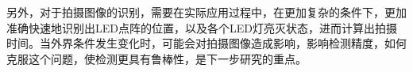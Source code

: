 另外，对于拍摄图像的识别，需要在实际应用过程中，在更加复杂的条件下，更加准确快速地识别出LED点阵的位置，以及各个LED灯亮灭状态，进而计算出拍摄时间。当外界条件发生变化时，可能会对拍摄图像造成影响，影响检测精度，如何克服这个问题，使检测更具有鲁棒性，是下一步研究的重点。



















































